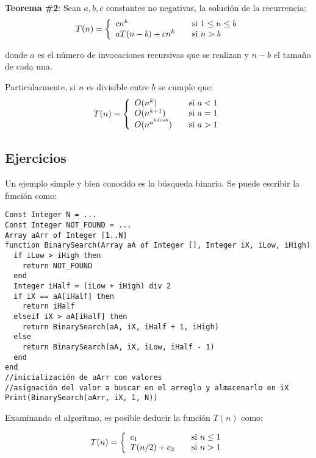 \textbf{Teorema \#2}: Sean $a, b, c$ constantes no negativas, la solución de la recurrencia:
\begin{equation}
T(n) = \left\{
  \begin{array}{l l}
    cn^{k} & \quad \text{si $1 \le n \le b$}\\
    aT(n-b) + cn^{k}& \quad \text{si $n > b$}
  \end{array} \right.
 \end{equation}
 
\noindent donde $a$ es el número de invocaciones recursivas que se realizan y $n-b$ el tamaño de cada una.

Particularmente, si $n$ es divisible entre $b$ se cumple que:
\begin{equation}
T(n) = \left\{
  \begin{array}{l l}
    O(n^{k}) & \quad \text{si $a < 1$}\\
    O(n^{k+1}) & \quad \text{si $a = 1$}\\
    O(n^{a^{k div b}}) & \quad \text{si $a > 1$}
  \end{array} \right.
\end{equation}

\subsection{Ejercicios}

Un ejemplo simple y bien conocido es la búsqueda binario. Se puede escribir la función como:

\begin{lstlisting}[upquote=true, language=pseudo]
Const Integer N = ...
Const Integer NOT_FOUND = ...
Array aArr of Integer [1..N]
function BinarySearch(Array aA of Integer [], Integer iX, iLow, iHigh)
  if iLow > iHigh then
    return NOT_FOUND
  end
  Integer iHalf = (iLow + iHigh) div 2
  if iX == aA[iHalf] then
    return iHalf
  elseif iX > aA[iHalf] then
    return BinarySearch(aA, iX, iHalf + 1, iHigh)
  else
    return BinarySearch(aA, iX, iLow, iHalf - 1)
  end
end
//inicialización de aArr con valores
//asignación del valor a buscar en el arreglo y almacenarlo en iX
Print(BinarySearch(aArr, iX, 1, N))
\end{lstlisting}

Examinando el algoritmo, es posible deducir la función $T(n)$ como:

\begin{equation}
T(n) = \left\{
  \begin{array}{l l}
    c_1 & \quad \text{si $n \le 1$}\\
    T(n/2) + c_2& \quad \text{si $n > 1$}
  \end{array} \right.
\end{equation}

